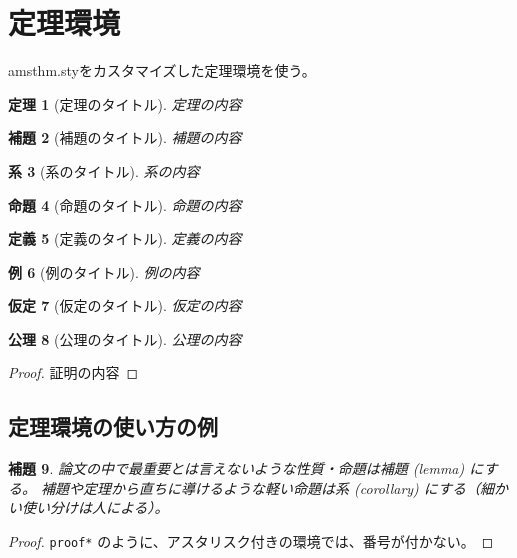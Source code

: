 \documentclass[uplatex]{sumiilab-paper}
\theoremstyle{mystyle}
\newtheorem{definition}{定義}
\newtheorem{theorem}[definition]{定理}
\newtheorem{corollary}[definition]{系}
\newtheorem{proposition}[definition]{命題}
\newtheorem{lemma}[definition]{補題}
\newtheorem{example}[definition]{例}
\newtheorem{assumption}[definition]{仮定}
\newtheorem{axiom}[definition]{公理}
\numberwithin{definition}{chapter} %
\begin{document}
\section{定理環境}

amsthm.styをカスタマイズした定理環境を使う。

\begin{theorem}[定理のタイトル]
  定理の内容
\end{theorem}

\begin{lemma}[補題のタイトル]
  補題の内容
\end{lemma}

\begin{corollary}[系のタイトル]
  系の内容
\end{corollary}

\begin{proposition}[命題のタイトル]
  命題の内容
\end{proposition}

\begin{definition}[定義のタイトル]
  定義の内容
\end{definition}

\begin{example}[例のタイトル]
  例の内容
\end{example}

\begin{assumption}[仮定のタイトル]
  仮定の内容
\end{assumption}

\begin{axiom}[公理のタイトル]
  公理の内容
\end{axiom}

\begin{proof}
  証明の内容
\end{proof}

\subsection{定理環境の使い方の例}

\begin{lemma}
  \label{lem:interesting-lemma}
  論文の中で最重要とは言えないような性質・命題は補題 (lemma) にする。
  補題や定理から直ちに導けるような軽い命題は系 (corollary) にする（細かい使い分けは人による）。
\end{lemma}

\begin{proof}
  \lstinline|proof*| のように、アスタリスク付きの環境では、番号が付かない。
\end{proof}
\end{document}
